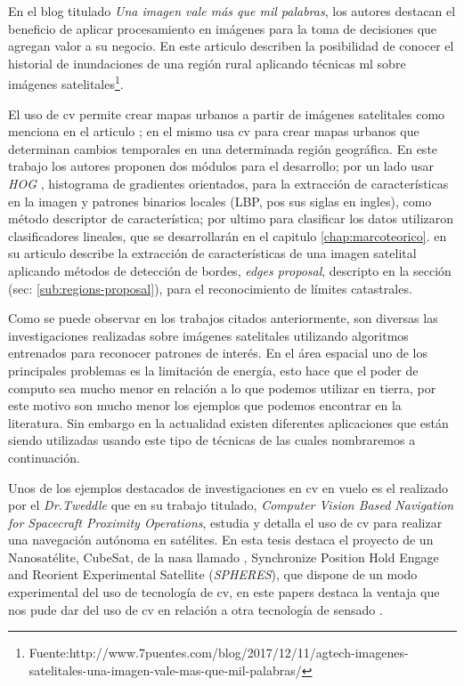En el blog titulado \textit{Una imagen vale más que mil palabras}, los autores destacan el beneficio de aplicar procesamiento en imágenes para la toma de decisiones que agregan valor a su negocio. En este articulo describen la posibilidad de conocer el historial de inundaciones de una región rural aplicando técnicas \ac{ml} sobre imágenes satelitales\footnote{Fuente:http://www.7puentes.com/blog/2017/12/11/agtech-imagenes-satelitales-una-imagen-vale-mas-que-mil-palabras/}.

El uso de \ac{cv} permite crear mapas urbanos a partir de imágenes satelitales como menciona en el articulo \citep{detectionHOG}; en el mismo usa \ac{cv} para crear mapas urbanos que determinan cambios temporales en una determinada región geográfica. En este trabajo los autores proponen dos módulos para el desarrollo; por un lado usar \textit{HOG} , histograma de gradientes orientados,\citep{HOG_algoritmo} para la extracción de características en la imagen y patrones binarios locales (LBP, pos sus siglas en ingles)\citep{LBP}, como método descriptor de característica; por ultimo para clasificar los datos utilizaron clasificadores lineales, que se desarrollarán en el capitulo \ref{chap:marcoteorico}. \cite{usman} en su articulo describe la extracción de características de una imagen satelital aplicando métodos de  detección de bordes, \textit{edges proposal}\citep{proposal}, descripto en la sección (sec: \ref{sub:regions-proposal}), para el reconocimiento de límites catastrales.

Como se puede observar en los trabajos citados anteriormente, son diversas las investigaciones realizadas sobre imágenes satelitales utilizando algoritmos entrenados para reconocer patrones de interés. En el área espacial uno de los principales problemas es la limitación de energía, esto hace que el poder de computo sea mucho menor en relación a lo que podemos utilizar en tierra, por este motivo son mucho menor los ejemplos que podemos encontrar en la literatura. Sin embargo en la actualidad existen diferentes aplicaciones que están siendo utilizadas usando este tipo de técnicas de las cuales nombraremos a continuación.

Unos de los ejemplos destacados de investigaciones en \ac{cv} en vuelo es el realizado por el \textit{Dr.Tweddle} que en su trabajo titulado, \textit{Computer Vision Based Navigation for Spacecraft Proximity Operations}, estudia y detalla el uso de \ac{cv} para realizar una navegación autónoma en satélites. En esta tesis destaca el proyecto de un Nanosatélite, CubeSat, de la \ac{nasa} llamado , Synchronize Position Hold Engage and Reorient Experimental Satellite (\textit{SPHERES}), que dispone de un modo experimental del uso de tecnología de \ac{cv}, en este papers destaca la ventaja que nos pude dar del uso de \ac{cv} en relación a otra tecnología de sensado \citep{Brent}.

